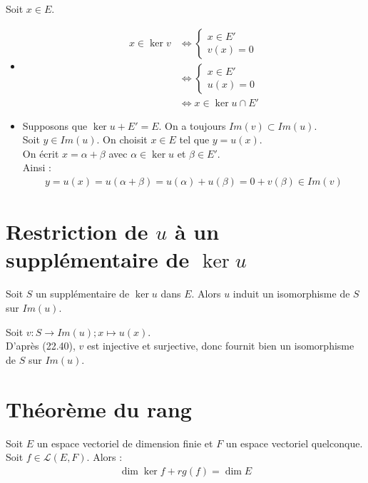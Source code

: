 \documentclass[../main.tex]{subfiles}
\begin{document}
\noindent Soit $x\in E$. 
\begin{itemize}
    \item \begin{align*}
        x \in \ker v &\Leftrightarrow \begin{cases}
            x \in E' \\
            v(x) = 0
        \end{cases} \\
        &\Leftrightarrow \begin{cases}
            x \in E' \\
            u(x) = 0
        \end{cases} \\
        &\Leftrightarrow x \in \ker u \cap E'
    \end{align*}

    \item Supposons que $\ker u + E' = E$. On a toujours $Im(v) \subset Im(u)$. \\
    Soit $y\in Im(u)$. On choisit $x\in E$ tel que $y = u(x)$. \\
    On écrit $x = \alpha + \beta$ avec $\alpha \in \ker u$ et $\beta \in E'$. \\
    Ainsi :
    \begin{align*}
        y = u(x) = u(\alpha  + \beta) = u(\alpha) + u(\beta) = 0 + v(\beta) \in Im(v)
    \end{align*}
\end{itemize}

\section{Restriction de $u$ à un supplémentaire de $\ker u$}
\begin{tcolorbox}[title=Corollaire 22.41, title filled=false, colframe=orange, colback=orange!10!white]
    Soit $S$ un supplémentaire de $\ker u$ dans $E$. Alors $u$ induit un isomorphisme de $S$ sur $Im(u)$. 
\end{tcolorbox}

\noindent Soit $v:S\to Im(u); x\mapsto u(x)$. \\
D'après (22.40), $v$ est injective et surjective, donc fournit bien un isomorphisme de $S$ sur $Im(u)$.

\section{Théorème du rang}
\begin{tcolorbox}[title=Théorème 22.43, title filled=false, colframe=orange, colback=orange!10!white]
    Soit $E$ un espace vectoriel de dimension finie et $F$ un espace vectoriel quelconque. Soit $f\in \mathcal{L}(E, F)$. Alors : 
    \begin{align*}
        \dim \ker f + rg(f) = \dim E
    \end{align*}
\end{tcolorbox}
\end{document}
